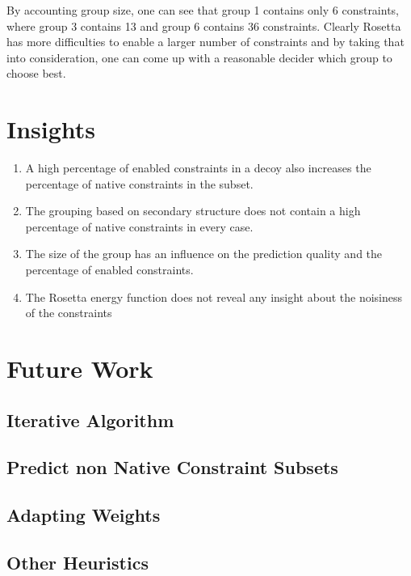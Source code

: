 \documentclass[a4paper, 11pt, parskip=half]{scrartcl}
\begin{document}
By accounting group size, one can see that group 1 contains only 6 constraints, where group 3 contains 13 and group 6 contains 36 constraints. Clearly Rosetta has more difficulties to enable a larger number of constraints and by taking that into consideration, one can come up with a reasonable decider which group to choose best.

\section{Insights}

\begin{enumerate}
\item A high percentage of enabled constraints in a decoy also increases the percentage of native constraints in the subset.
\item The grouping based on secondary structure does not contain a high percentage of native constraints in every case.
\item The size of the group has an influence on the prediction quality and the percentage of enabled constraints.
\item The Rosetta energy function does not reveal any insight about the noisiness of the constraints
\end{enumerate}


\section{Future Work}

\subsection{Iterative Algorithm}

\subsection{Predict non Native Constraint Subsets}

\subsection{Adapting Weights}

\subsection{Other Heuristics}
\end{document}
